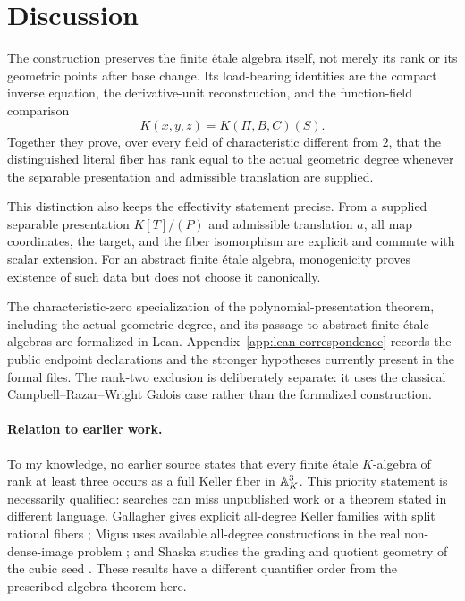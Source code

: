\section{Discussion}

The construction preserves the finite \'etale algebra itself, not merely its
rank or its geometric points after base change.  Its load-bearing identities
are the compact inverse equation, the derivative-unit reconstruction, and
the function-field comparison
\[
 K(x,y,z)=K(\Pi,B,C)(S).
\]
Together they prove, over every field of characteristic different from
\(2\), that the distinguished literal fiber has rank equal to the actual
geometric degree whenever the separable presentation and admissible
translation are supplied.

This distinction also keeps the effectivity statement precise.  From a
supplied separable presentation \(K[T]/(P)\) and admissible translation
\(a\), all map coordinates, the target, and the fiber isomorphism are
explicit and commute with scalar extension.  For an abstract finite \'etale
algebra, monogenicity proves existence of such data but does not choose it
canonically.

The characteristic-zero specialization of the polynomial-presentation
theorem, including the actual geometric degree, and its passage to abstract
finite \'etale algebras are formalized in Lean.
Appendix~\ref{app:lean-correspondence} records the public endpoint
declarations and the stronger hypotheses currently present in the formal
files.  The rank-two exclusion is deliberately separate: it uses the
classical Campbell--Razar--Wright Galois case rather than the formalized
construction.

\paragraph{Relation to earlier work.}
To my knowledge, no earlier source states that every finite \'etale
\(K\)-algebra of rank at least three occurs as a full Keller fiber in
\(\mathbb A^3_K\).  This priority statement is necessarily qualified: searches can
miss unpublished work or a theorem stated in different language.  Gallagher
gives explicit all-degree Keller families with split rational fibers
\cite{Gallagher}; Migus uses available all-degree constructions in the real
non-dense-image problem \cite{Migus}; and Shaska studies the grading and
quotient geometry of the cubic seed \cite{Shaska}.  These results have a
different quantifier order from the prescribed-algebra theorem here.

